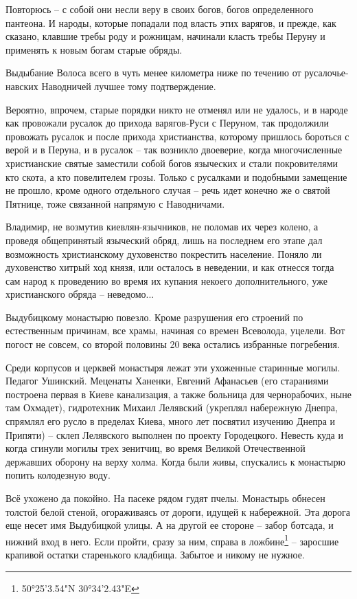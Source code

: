    Повторюсь – с собой они несли веру в своих богов, богов определенного пантеона. И народы, которые попадали под власть этих варягов, и прежде, как сказано, клавшие требы роду и рожницам, начинали класть требы Перуну и применять к новым богам старые обряды.

Выдыбание Волоса всего в чуть менее километра ниже по течению от русалочье-навских Наводничей лучшее тому подтверждение.

   Вероятно, впрочем, старые порядки никто не отменял или не удалось, и в народе как провожали русалок до прихода варягов-Руси с Перуном, так продолжили провожать русалок и после прихода христианства, которому пришлось бороться с верой и в Перуна, и в русалок – так возникло двоеверие, когда многочисленные христианские святые заместили собой богов языческих и стали покровителями кто скота, а кто повелителем грозы. Только с русалками и подобными замещение не прошло, кроме одного отдельного случая – речь идет конечно же о святой Пятнице, тоже связанной напрямую с Наводничами.

   Владимир, не возмутив киевлян-язычников, не поломав их через колено, а проведя общепринятый языческий обряд, лишь на последнем его этапе дал возможность христианскому духовенство покрестить население. Поняло ли духовенство хитрый ход князя, или осталось в неведении, и как отнесся тогда сам народ к проведению во время их купания некоего дополнительного, уже христианского обряда – неведомо... 

Выдубицкому монастырю повезло. Кроме разрушения его строений по естественным причинам, все храмы, начиная со времен Всеволода, уцелели. Вот погост не совсем, со второй половины 20 века остались избранные погребения.

Среди корпусов и церквей монастыря лежат эти ухоженные старинные могилы. Педагог Ушинский. Меценаты Ханенки, Евгений Афанасьев (его стараниями построена первая в Киеве канализация, а также больница для чернорабочих, ныне там Охмадет), гидротехник Михаил Лелявский (укреплял набережную Днепра, спрямлял его русло в пределах Киева, много лет посвятил изучению Днепра и Припяти) – склеп Лелявского выполнен по проекту Городецкого. Невесть куда и когда сгинули могилы трех зенитчиц, во время Великой Отечественной державших оборону на верху холма. Когда были живы, спускались к монастырю попить колодезную воду.

Всё ухожено да покойно. На пасеке рядом гудят пчелы. Монастырь обнесен толстой белой стеной, огораживаясь от дороги, идущей к набережной. Эта дорога еще несет имя Выдубицкой улицы. А на другой ее стороне – забор ботсада, и нижний вход в него. Если пройти, сразу за ним, справа в ложбине\footnote{50°25'3.54"N 30°34'2.43"E} – заросшие крапивой остатки старенького кладбища. Забытое и никому не нужное.

